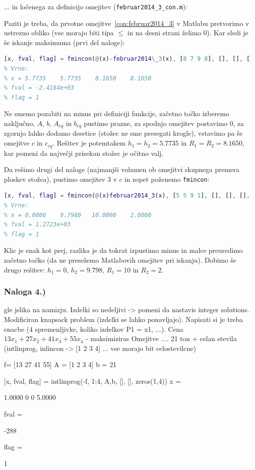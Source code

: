 \documentclass[a4paper,11pt]{article}
\begin{document}

... in ločenega za definicijo omejitev (\texttt{februar2014\_3\_con.m}):

Paziti je treba, da prvotne omejitve~\ref{con:februar2014_3} v Matlabu pretvorimo v ustrezno obliko (vse morajo biti tipa $\leq$ in na desni strani želimo 0).
Kar sledi je še iskanje maksimuma (prvi del naloge):
\begin{lstlisting}[language=Matlab]
[x, fval, flag] = fmincon(@(x)-februar2014\_3(x), [8 7 9 8], [], [], [], [], zeros(1,4), [10 10 10 10], @(x)februar2014\_3\_con(x))
% Vrne:
% x = 5.7735    5.7735    8.1650    8.1650
% fval = -2.4184e+03
% flag = 1
\end{lstlisting}
Ne smemo pozabiti na minus pri definiciji funkcije, začetno točko izberemo naključno, $A$, $b$, $A_{eq}$ in $b_{eq}$ pustimo prazne, za spodnjo omejitev postavimo 0, za zgornjo lahko dodamo desetice (stožec ne sme presegati krogle), vstavimo pa še omejitve $c$ in $c_{eq}$. Rešitev je potemtakem $h_1 = h_2 = 5.7735$ in $R_1 = R_2 = 8.1650$, kar pomeni da največji prisekan stožec je očitno valj.

Da rešimo drugi del naloge (najmanjši volumen ob omejitvi skupnega premera ploskev stožca), pustimo omejitev 3 v $c$ in zopet poženemo \texttt{fmincon}:
\begin{lstlisting}[language=Matlab]
[x, fval, flag] = fmincon(@(x)februar2014_3(x), [5 5 9 1], [], [], [], [], zeros(1,4), [10 10 10 10], @(x)februar2014_3_con(x))
% Vrne:
% x = 0.0000    9.7980   10.0000    2.0000
% fval = 1.2723e+03
% flag = 1
\end{lstlisting}
Klic je enak kot prej, razlika je da tokrat izpustimo minus in malce preuredimo začetno točko (da ne presežemo Matlabovih omejitev pri iskanju). Dobimo še drugo rešitev: $h_1 = 0$, $h_2 = 9.798$, $R_1=10$ in $R_2=2$.


\subsubsection{Naloga 4.)}

gle jslika na namizju. Izdelki so nedeljivi -> pomeni da nastavis integer solutions. Modificiran knapsack problem (izdelki se lahko ponavljajo). Napisati si je treba enacbe (4 spremenljivke, koliko izdelkov P1 = x1, ...).
Cena $13x_1  +27x_2 + 41x_3 + 55x_4$ - maksimiziras
Omejitve .... 21 ton + celan stevila (intlinprog, inlincon -> [1 2 3 4] ... vse morajo bit celostevilcne) 

f= [13 27 41 55]
A = [1 2 3 4]
b = 21

[x, fval, flag] = intlinprog(-f, 1:4, A,b, [], [], zeros(1,4))
x =

    1.0000
         0
         0
    5.0000

fval =

  -288

flag =

     1
\end{document}
